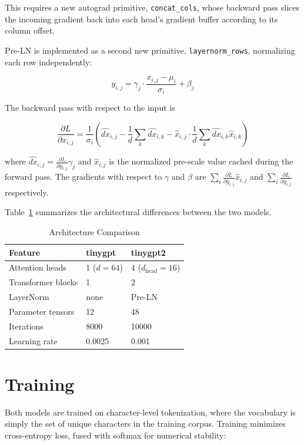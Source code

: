 \documentclass[conference]{IEEEtran}
\begin{document}
This requires a new autograd primitive, \texttt{concat\_cols}, whose backward pass slices the incoming gradient back into each head's gradient buffer according to its column offset.

Pre-LN is implemented as a second new primitive, \texttt{layernorm\_rows}, normalizing each row independently:

\begin{equation}
y_{i,j} = \gamma_j \cdot \frac{x_{i,j}-\mu_i}{\sigma_i} + \beta_j
\end{equation}

The backward pass with respect to the input is

\begin{equation}
\frac{\partial L}{\partial x_{i,j}} = \frac{1}{\sigma_i}\left(\widehat{dx}_{i,j} - \frac{1}{d}\sum_k \widehat{dx}_{i,k} - \hat{x}_{i,j}\cdot\frac{1}{d}\sum_k \widehat{dx}_{i,k}\hat{x}_{i,k}\right)
\end{equation}

where $\widehat{dx}_{i,j} = \frac{\partial L}{\partial y_{i,j}}\gamma_j$ and $\hat{x}_{i,j}$ is the normalized pre-scale value cached during the forward pass. The gradients with respect to $\gamma$ and $\beta$ are $\sum_i \frac{\partial L}{\partial y_{i,j}}\hat{x}_{i,j}$ and $\sum_i \frac{\partial L}{\partial y_{i,j}}$ respectively.

Table~\ref{tab:archcompare} summarizes the architectural differences between the two models.

\begin{table}[h]
\centering
\caption{Architecture Comparison}
\label{tab:archcompare}
\begin{tabular}{lll}
\toprule
Feature & tinygpt & tinygpt2 \\
\midrule
Attention heads & 1 ($d=64$) & 4 ($d_{\text{head}}=16$) \\
Transformer blocks & 1 & 2 \\
LayerNorm & none & Pre-LN \\
Parameter tensors & 12 & 48 \\
Iterations & 8000 & 10000 \\
Learning rate & 0.0025 & 0.001 \\
\bottomrule
\end{tabular}
\end{table}

\section{Training}
Both models are trained on character-level tokenization, where the vocabulary is simply the set of unique characters in the training corpus. Training minimizes cross-entropy loss, fused with softmax for numerical stability:
\end{document}
